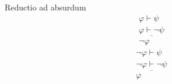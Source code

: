 \begin{ruleinf} \label{relinf_absurdum} Reductio ad absurdum
	\begin{equation}
	\begin{gathered}
	    \varphi \vdash \psi \\
		\underline {\varphi \vdash \lnot \psi } \\
		\lnot \varphi 
	\end{gathered}
	\end{equation}
	\begin{equation}
	\begin{gathered}
		\lnot\varphi \vdash \psi \\
		\underline {\lnot\varphi \vdash \lnot \psi } \\
		\varphi 
	\end{gathered}
\end{equation}
\end{ruleinf}
